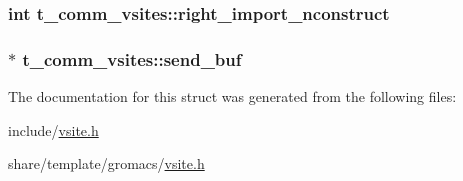 \hypertarget{structt__comm__vsites_a1684962fedc1259eead9bc07746c7195}{
\subsubsection[{right\-\_\-import\-\_\-nconstruct}]{\setlength{\rightskip}{0pt plus 5cm}int {\bf t\-\_\-comm\-\_\-vsites\-::right\-\_\-import\-\_\-nconstruct}}}\label{structt__comm__vsites_a1684962fedc1259eead9bc07746c7195}
\hypertarget{structt__comm__vsites_a12beb1d9681bc5e7cd99431a49984bb8}{
\subsubsection[{send\-\_\-buf}]{ $\ast$ {\bf t\-\_\-comm\-\_\-vsites\-::send\-\_\-buf}}}\label{structt__comm__vsites_a12beb1d9681bc5e7cd99431a49984bb8}


\-The documentation for this struct was generated from the following files\-:\begin{DoxyCompactItemize}
\item 
include/\hyperlink{include_2vsite_8h}{vsite.\-h}\item 
share/template/gromacs/\hyperlink{share_2template_2gromacs_2vsite_8h}{vsite.\-h}\end{DoxyCompactItemize}
